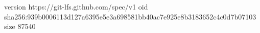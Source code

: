 version https://git-lfs.github.com/spec/v1
oid sha256:939b0006113d127a6395e5e3a698581bb40ac7e925e8b3183652c4c0d7b07103
size 87540
